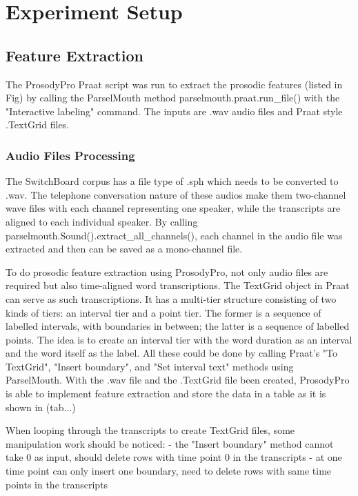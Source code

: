 \chapter{Experiment Setup}

\section{Feature Extraction}
The ProsodyPro Praat script was run to extract the prosodic features (listed in Fig) by calling the ParselMouth method parselmouth.praat.run\_file() with the "Interactive labeling" command. The inputs are .wav audio files and Praat style .TextGrid files.  

\subsection{Audio Files Processing}
The SwitchBoard corpus has a file type of .sph which needs to be converted to .wav. The telephone conversation nature of these audios make them two-channel wave files with each channel representing one speaker, while the transcripts are aligned to each individual speaker. By calling parselmouth.Sound().extract\_all\_channels(), each channel in the audio file was extracted and then can be saved as a mono-channel file.

To do prosodic feature extraction using ProsodyPro, not only audio files are required but also time-aligned word transcriptions. The TextGrid object in Praat can serve as such transcriptions. It has a multi-tier structure consisting of two kinds of tiers: an interval tier and a point tier. The former is a sequence of labelled intervals, with boundaries in between; the latter is a sequence of labelled points. The idea is to create an interval tier with the word duration as an  interval and the word itself as the label. All these could be done by calling Praat's "To TextGrid", "Insert boundary", and "Set interval text" methods using ParselMouth. With the .wav file and the .TextGrid file been created, ProsodyPro is able to implement feature extraction and store the data in a table as it is shown in (tab...)

When looping through the transcripts to create TextGrid files, some manipulation work should be noticed:
- the "Insert boundary" method cannot take 0 as input, should delete rows with time point 0 in the transcripts
- at one time point can only insert one boundary, need to delete rows with same time points in the transcripts

